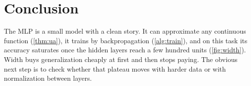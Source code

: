 \section{Conclusion}
\label{sec:conclusion}

The MLP is a small model with a clean story.
It can approximate any continuous function (\cref{thm:ua}), it trains by
backpropagation (\cref{alg:train}), and on this task its accuracy saturates once
the hidden layers reach a few hundred units (\cref{fig:width}).
Width buys generalization cheaply at first and then stops paying.
The obvious next step is to check whether that plateau moves with harder data or
with normalization between layers.
